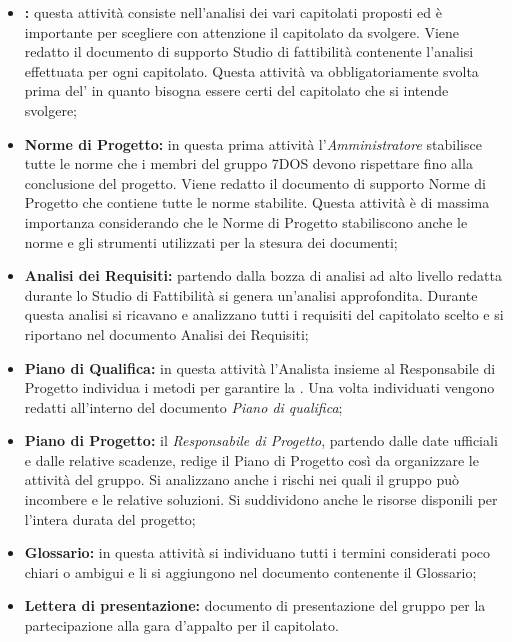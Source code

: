 \begin{itemize}

	\item \textbf{:} questa attività consiste nell'analisi dei vari capitolati proposti ed è importante per scegliere con attenzione il capitolato da svolgere. Viene redatto il documento di supporto Studio di fattibilità contenente l'analisi effettuata per ogni capitolato. Questa attività va obbligatoriamente svolta prima del' in quanto bisogna essere certi del capitolato che si intende svolgere;

	\item \textbf{Norme di Progetto:} in questa prima attività l'\emph{Amministratore} stabilisce tutte le norme che i membri del gruppo 7DOS devono rispettare fino alla conclusione del progetto. Viene redatto il documento di supporto Norme di Progetto che contiene tutte le norme stabilite. Questa attività è di massima importanza considerando che le Norme di Progetto stabiliscono anche le norme e gli strumenti utilizzati per la stesura dei documenti;

	\item \textbf{Analisi dei Requisiti:} partendo dalla bozza di analisi ad alto livello redatta durante lo Studio di Fattibilità si genera un'analisi approfondita. Durante questa analisi si ricavano e analizzano tutti i requisiti del capitolato scelto e si riportano nel documento Analisi dei Requisiti;

	\item \textbf{Piano di Qualifica:} in questa attività l'Analista insieme al Responsabile di Progetto individua i metodi per garantire la . Una volta individuati vengono redatti all'interno del documento \textit{Piano di qualifica};

	\item \textbf{Piano di Progetto:} il \emph{Responsabile di Progetto}, partendo dalle date ufficiali e dalle relative scadenze, redige il Piano di Progetto così da organizzare le attività del gruppo. Si analizzano anche i rischi nei quali il gruppo può incombere e le relative soluzioni. Si suddividono anche le risorse disponili per l'intera durata del progetto;

	\item \textbf{Glossario:} in questa attività si individuano tutti i termini considerati poco chiari o ambigui e li si aggiungono nel documento contenente il Glossario;
	
	\item \textbf{Lettera di presentazione:} documento di presentazione del gruppo per la partecipazione alla gara d'appalto per il capitolato.

\end{itemize}

